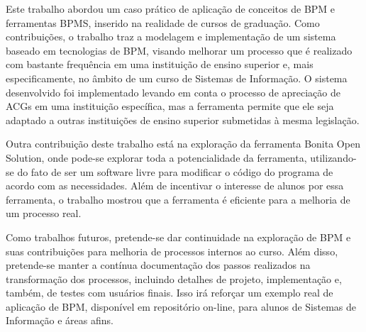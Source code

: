 \documentclass[12pt]{article}
\begin{document}
Este trabalho abordou um caso prático de aplicação de conceitos de BPM e ferramentas BPMS, inserido na realidade de cursos de graduação. Como contribuições, o trabalho traz a modelagem e implementação de um sistema baseado em tecnologias de BPM, visando melhorar um processo que é realizado com bastante frequência em uma instituição de ensino superior e, mais especificamente, no âmbito de um curso de Sistemas de Informação. O sistema desenvolvido foi implementado levando em conta o processo de apreciação de ACGs em uma instituição específica, mas a ferramenta permite que ele seja adaptado a outras instituições de ensino superior submetidas à mesma legislação.

Outra contribuição deste trabalho está na exploração da ferramenta Bonita Open Solution, onde pode-se explorar toda a potencialidade da ferramenta, utilizando-se do fato de ser um software livre para modificar o código do programa de acordo com as necessidades. Além de incentivar o interesse de alunos por essa ferramenta, o trabalho mostrou que a ferramenta é eficiente para a melhoria de um processo real.

Como trabalhos futuros, pretende-se dar continuidade na exploração de BPM e suas contribuições para melhoria de processos internos ao curso. Além disso, pretende-se manter a contínua documentação dos passos realizados na transformação dos processos, incluindo detalhes de projeto, implementação e, também, de testes com usuários finais. Isso irá reforçar um exemplo real de aplicação de BPM, disponível em repositório on-line, para alunos de Sistemas de Informação e áreas afins.




\end{document}
